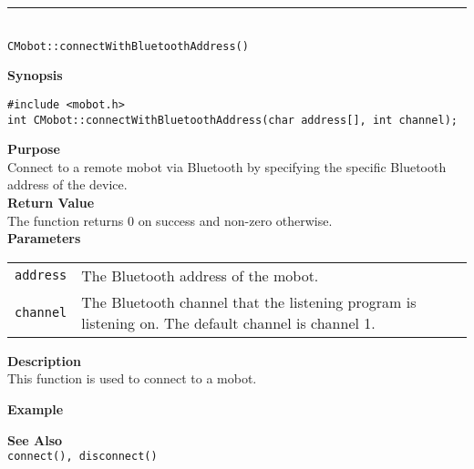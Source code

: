 \noindent
\vspace{5pt}
\rule{4.5in}{0.015in} \\
\noindent
{\LARGE \texttt{CMobot::connectWithBluetoothAddress()}}\\
{}

\noindent
{\bf Synopsis}
\vspace{-8pt}
\begin{verbatim}
#include <mobot.h>
int CMobot::connectWithBluetoothAddress(char address[], int channel);
\end{verbatim}

\noindent
{\bf Purpose}\\
Connect to a remote mobot via Bluetooth by specifying the specific Bluetooth
address of the device.\\

\noindent
{\bf Return Value}\\
The function returns 0 on success and non-zero otherwise.\\

\noindent
{\bf Parameters}
\vspace{-0.1in}
\begin{description}
\item               
\begin{tabular}{p{10 mm}p{145 mm}}
\texttt{address} & The Bluetooth address of the mobot. \\
\texttt{channel} & The Bluetooth channel that the listening program is
listening on. The default channel is channel 1. \\
\end{tabular}
\end{description}

\noindent
{\bf Description}\\
This function is used to connect to a mobot. 

\noindent
{\bf Example}\\
\noindent

\noindent
{\bf See Also}\\
\texttt{connect(), disconnect()}

